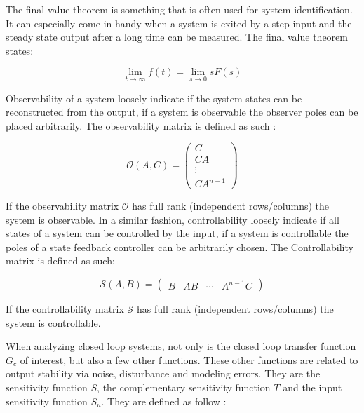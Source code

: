 \documentclass[a4paper, titlepage]{article}
\begin{document}
The final value theorem is something that is often used for system identification.
It can especially come in handy when a system is exited by a step input and the steady state output after a long time can be measured.
The final value theorem states\citep[p.~29]{glad00}:

\begin{equation}
\lim_{t \to \infty} f(t) = \lim_{s \to 0} sF(s)
\label{equ:finalTheorem}
\end{equation}

Observability of a system loosely indicate if the system states can be reconstructed from the output, if a system is observable the observer poles can be placed arbitrarily.
The observability matrix is defined as such \citep[p.~45]{glad00}:

\begin{equation}
\mathcal{O}(A,C) = 
\begin{pmatrix}
C \\ CA \\ \vdots \\ CA^{n-1}
\end{pmatrix}
\label{equ:observ}
\end{equation}

If the observability matrix $\mathcal{O}$ has full rank (independent rows/columns) the system is observable.
In a similar fashion, controllability loosely indicate if all states of a system can be controlled by the input, if a system is controllable the poles of a state feedback controller can be arbitrarily chosen.
The Controllability matrix is defined as such\citep[p.~31]{glad00}:

\begin{equation}
\mathcal{S}(A,B) = 
\begin{pmatrix}
B & AB & \cdots & A^{n-1}C
\end{pmatrix}
\label{equ:contr}
\end{equation}

If the controllability matrix $\mathcal{S}$ has full rank (independent rows/columns) the system is controllable.

When analyzing closed loop systems, not only is the closed loop transfer function $G_c$ of interest, but also a few other functions.
These other functions are related to output stability via noise, disturbance and modeling errors.
They are the sensitivity function $S$, the complementary sensitivity function $T$ and the input sensitivity function $S_u$.
They are defined as follow \citep[p.~149]{glad00}:
\end{document}
